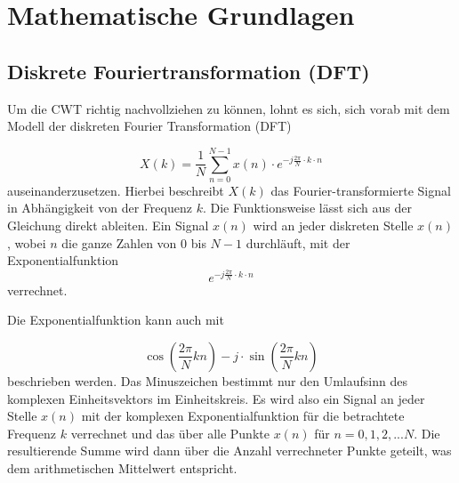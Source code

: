 %
%
%
%
\section{Mathematische Grundlagen
\label{wavelets:section:teil1}}

\subsection{Diskrete Fouriertransformation (DFT)
\label{wavelets:subsection:DFT}}
Um die CWT richtig nachvollziehen zu können, lohnt es sich, sich vorab mit dem Modell der diskreten Fourier Transformation (DFT) \cite{Hayes.1996} 

\begin{equation}
	X(k)=\frac{1}{N}\sum_{n=0}^{N-1}x(n)\cdot e^{-j\frac{2\pi}{N}\cdot k\cdot n}
	\label{wavelets:equation1}
\end{equation}
auseinanderzusetzen. Hierbei beschreibt $X(k)$  das Fourier-transformierte Signal in Abhängigkeit von der Frequenz $k$.
Die Funktionsweise lässt sich aus der Gleichung direkt ableiten.
Ein Signal $x(n)$ wird an jeder diskreten Stelle $x(n)$, wobei $n$ die ganze Zahlen von $0$ bis $N-1$ durchläuft, mit der Exponentialfunktion \[e^{-j\frac{2\pi}{N}\cdot k\cdot n}\] verrechnet.

Die Exponentialfunktion kann auch mit

\begin{equation}
	\cos \left( \frac{2\pi}{N}kn \right) -j\cdot \sin \left( \frac{2\pi}{N}kn \right)
	\label{wavelets:equation2}
\end{equation} 
beschrieben werden. Das Minuszeichen bestimmt nur den Umlaufsinn des komplexen Einheitsvektors im Einheitskreis.
Es wird also ein Signal an jeder Stelle $x(n)$ mit der komplexen Exponentialfunktion für die betrachtete Frequenz $k$ verrechnet und das über alle Punkte $x(n)$ für $n=0,1,2,...N$. Die resultierende Summe wird dann über die Anzahl verrechneter Punkte geteilt, was dem arithmetischen Mittelwert entspricht.

